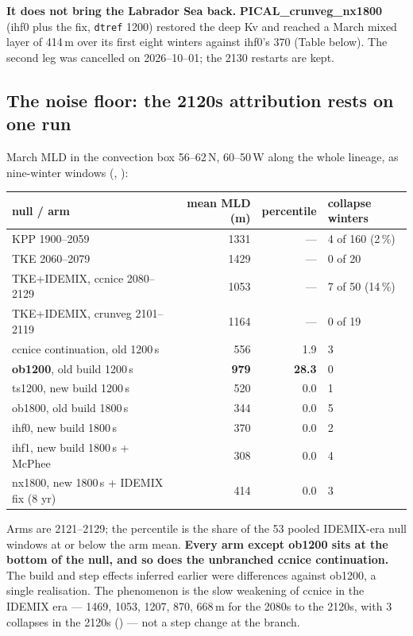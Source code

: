 \documentclass[10pt]{article}
\begin{document}
\textbf{It does not bring the Labrador Sea back.} \textbf{PICAL\_crunveg\_nx1800} (ihf0 plus the
fix, \texttt{dtref} 1200) restored the deep Kv and reached a March mixed layer of 414\,m over its
first eight winters against ihf0's 370 (Table below). The second leg was cancelled on
2026--10--01; the 2130 restarts are kept.

\subsection{The noise floor: the 2120s attribution rests on one run}\label{sub:r42noise}

March MLD in the convection box 56--62\,N, 60--50\,W along the whole lineage, as nine-winter
windows (,
):

\begin{center}\small
\begin{tabular}{lrrl}
\toprule
null / arm & mean MLD (m) & percentile & collapse winters \\
\midrule
KPP 1900--2059                         & 1331 & --- & 4 of 160 (2\,\%) \\
TKE 2060--2079                         & 1429 & --- & 0 of 20 \\
TKE+IDEMIX, ccnice 2080--2129          & 1053 & --- & 7 of 50 (14\,\%) \\
TKE+IDEMIX, crunveg 2101--2119         & 1164 & --- & 0 of 19 \\
\midrule
ccnice continuation, old 1200\,s       & 556 & 1.9 & 3 \\
\textbf{ob1200}, old build 1200\,s     & \textbf{979} & \textbf{28.3} & 0 \\
ts1200, new build 1200\,s              & 520 & 0.0 & 1 \\
ob1800, old build 1800\,s              & 344 & 0.0 & 5 \\
ihf0, new build 1800\,s                & 370 & 0.0 & 2 \\
ihf1, new build 1800\,s + McPhee       & 308 & 0.0 & 4 \\
nx1800, new 1800\,s + IDEMIX fix (8 yr)& 414 & 0.0 & 3 \\
\bottomrule
\end{tabular}
\end{center}

Arms are 2121--2129; the percentile is the share of the 53 pooled IDEMIX-era null windows at or
below the arm mean. \textbf{Every arm except ob1200 sits at the bottom of the null, and so does the
unbranched ccnice continuation.} The build and step effects inferred earlier were differences
against ob1200, a single realisation. The phenomenon is the slow weakening of ccnice in the IDEMIX
era --- 1469, 1053, 1207, 870, 668\,m for the 2080s to the 2120s, with 3 collapses in the 2120s
() --- not a step change at the branch.
\end{document}
